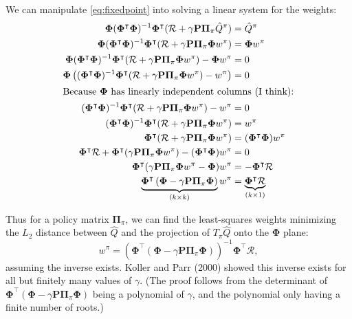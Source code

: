 \documentclass{article}
\newcommand{\parens}[1]{\left(#1\right)}
\begin{document}
We can manipulate \eqref{eq:fixedpoint} into solving a linear system for the weights:
\begin{align*}
	\mathbf{\Phi}(\mathbf{\Phi}^\intercal\mathbf{\Phi})^{-1}\mathbf{\Phi}^\intercal
		(\mathcal{R}+\gamma \mathbf{P}\mathbf{\Pi}_{\pi}\hat{Q}^{\pi})&=\hat{Q}^{\pi}\\	\mathbf{\Phi}(\mathbf{\Phi}^\intercal\mathbf{\Phi})^{-1}\mathbf{\Phi}^\intercal
				(\mathcal{R}+\gamma \mathbf{P}\mathbf{\Pi}_{\pi}\mathbf{\Phi}w^{\pi})&=\mathbf{\Phi}w^{\pi}\\
		\mathbf{\Phi}(\mathbf{\Phi}^\intercal\mathbf{\Phi})^{-1}\mathbf{\Phi}^\intercal
				(\mathcal{R}+\gamma \mathbf{P}\mathbf{\Pi}_{\pi}\mathbf{\Phi}w^{\pi})-\mathbf{\Phi}w^{\pi}&=0\\
		\mathbf{\Phi}\parens{(\mathbf{\Phi}^\intercal\mathbf{\Phi})^{-1}\mathbf{\Phi}^\intercal
						(\mathcal{R}+\gamma \mathbf{P}\mathbf{\Pi}_{\pi}\mathbf{\Phi}w^{\pi})-w^{\pi}}&=0\\
		\shortintertext{Because $\mathbf{\Phi}$ has linearly independent columns (I think):}
		(\mathbf{\Phi}^\intercal\mathbf{\Phi})^{-1}\mathbf{\Phi}^\intercal
						(\mathcal{R}+\gamma \mathbf{P}\mathbf{\Pi}_{\pi}\mathbf{\Phi}w^{\pi})-w^{\pi}&=0\\
		(\mathbf{\Phi}^\intercal\mathbf{\Phi})^{-1}\mathbf{\Phi}^\intercal
						(\mathcal{R}+\gamma \mathbf{P}\mathbf{\Pi}_{\pi}\mathbf{\Phi}w^{\pi})&=w^{\pi}\\
		\mathbf{\Phi}^\intercal(\mathcal{R}+\gamma \mathbf{P}\mathbf{\Pi}_{\pi}\mathbf{\Phi}w^{\pi})&=(\mathbf{\Phi}^\intercal\mathbf{\Phi})w^{\pi}\\
		\mathbf{\Phi}^\intercal\mathcal{R}+\mathbf{\Phi}^\intercal(\gamma \mathbf{P}\mathbf{\Pi}_{\pi}\mathbf{\Phi}w^{\pi})-(\mathbf{\Phi}^\intercal\mathbf{\Phi})w^{\pi}&=0\\
		\mathbf{\Phi}^\intercal(\gamma \mathbf{P}\mathbf{\Pi}_{\pi}\mathbf{\Phi}w^{\pi}-\mathbf{\Phi})w^{\pi}&=
			-\mathbf{\Phi}^\intercal\mathcal{R}\\
		\underbrace{\mathbf{\Phi}^\intercal\parens{\mathbf{\Phi}-\gamma \mathbf{P}\mathbf{\Pi}_{\pi}\mathbf{\Phi}}
		}_{(k\times k)}
		w^{\pi}&=
		\underbrace{\mathbf{\Phi}^\intercal\mathcal{R}}_{(k\times 1)}\\
		\end{align*}

Thus for a policy matrix $\mathbf{\Pi}_{\pi}$, we can find the least-squares weights minimizing the $L_{2}$ distance between $\hat{Q}$ and the projection of  $T_{\pi}\hat{Q}$ onto the $\mathbf{\Phi}$ plane:
\[
	w^{\pi}=\parens{\mathbf{\Phi}^\intercal\parens{\mathbf{\Phi}-\gamma \mathbf{P}\mathbf{\Pi}_{\pi}\mathbf{\Phi}}}^{-1}\mathbf{\Phi}^\intercal\mathcal{R},
\]
assuming the inverse exists. 
Koller and Parr (2000) showed this inverse exists for all but finitely many values of $\gamma$. (The proof follows from the determinant of $	\mathbf{\Phi}^\intercal\parens{\mathbf{\Phi}-\gamma \mathbf{P}\mathbf{\Pi}_{\pi}\mathbf{\Phi}}$ being a polynomial of $\gamma$, and the polynomial only having a finite number of roots.)
\end{document}
